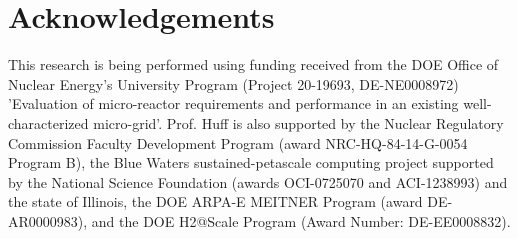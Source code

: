 \documentclass{anstrans}
\begin{document}
\section{Acknowledgements}

This research is being performed using funding received from the DOE Office of Nuclear Energy's University Program (Project 20-19693, DE-NE0008972) 'Evaluation of micro-reactor requirements and performance in an existing well-characterized micro-grid'.
Prof. Huff is also supported by the Nuclear Regulatory Commission Faculty Development Program (award NRC-HQ-84-14-G-0054 Program B), the Blue Waters sustained-petascale computing project supported by the National Science Foundation (awards OCI-0725070 and ACI-1238993) and the state of Illinois, the DOE ARPA-E MEITNER Program (award DE-AR0000983), and the DOE H2@Scale Program (Award Number: DE-EE0008832).



\end{document}
